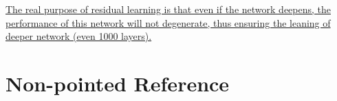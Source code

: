 \documentclass[10pt,onecolumn]{book}
\begin{document}
\uline{The real purpose of residual learning is that even if the network deepens, the performance of this network will not degenerate, thus ensuring the leaning of deeper network (even 1000 layers).}

\chapter{Non-pointed Reference}
\cite{he2016deep}
\cite{he2016deep1}
\cite{he2016deep2}


{\small


}

%
%
\end{document}
